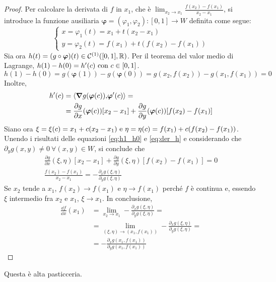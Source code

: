 \begin{proof}
    Per calcolare la derivata di $f$ in $x_1$, che è $\displaystyle\lim_{x_2\to x_1}\frac{f(x_2)-f(x_1)}{x_2-x_1}$, si introduce la funzione ausiliaria $\bm \varphi=(\varphi_1,\varphi_2):[0,1]\to W$ definita come segue:
    $$
        \begin{cases}
            x=\varphi_1(t)=x_1+t(x_2-x_1)\\
            y=\varphi_2(t)=f(x_1)+t(f(x_2)-f(x_1))
        \end{cases}
    $$
    Sia ora $h(t)=(g\circ\bm\varphi)(t) \in \mathcal{C}^{(1)}([0,1],\mathbb{R})$. Per il teorema del valor medio di Lagrange, $h(1)-h(0)=h'(c) \text{ con } c \in [0,1]$.
    \begin{equation}
        h(1)-h(0)=g(\bm\varphi(1))-g(\bm\varphi(0))=g(x_2,f(x_2))-g(x_1,f(x_1))=0\label{eq:h1_h0}
    \end{equation}
    Inoltre,
    \begin{align}
        h'(c)
        &=\left\langle\grad g(\bm\varphi(c)){,}\bm\varphi'(c)\right\rangle=\notag\\
        &=\frac{\partial g}{\partial x}(\bm\varphi(c))[x_2-x_1]+\frac{\partial g}{\partial y}(\bm\varphi(c))[f(x_2)-f(x_1)]\label{eq:der_h}
    \end{align}
    Siano ora $\xi=\xi(c)=x_1+c(x_2-x_1) \text{ e } \eta=\eta(c)=f(x_1)+c(f(x_2)-f(x_1))$. Unendo i risultati delle equazioni \eqref{eq:h1_h0} e \eqref{eq:der_h} e considerando che $\partial_yg(x,y)\neq 0 \ \forall (x,y) \in W$, si conclude che
    \begin{gather*}
        \frac{\partial g}{\partial x}(\xi,\eta)[x_2-x_1]+\frac{\partial g}{\partial y}(\xi,\eta)[f(x_2)-f(x_1)]=0\\
        \frac{f(x_2)-f(x_1)}{x_2-x_1}=-\frac{\partial_x g(\xi,\eta)}{\partial_y g(\xi,\eta)}
    \end{gather*}
    Se $x_2$ tende a $x_1$, $f(x_2)\to f(x_1)$ e $\eta \to f(x_1)$ perché $f$ è continua e, essendo $\xi$ intermedio fra $x_2$ e $x_1$, $\xi \to x_1$. In conclusione,
    \begin{align*}
        \frac{\dd f}{\dd x}(x_1)&=\lim_{x_2\to x_1}-\frac{\partial_x g(\xi,\eta)}{\partial_y g(\xi,\eta)}=\\
        &=\lim_{(\xi,\eta)\to(x_1,f(x_1))}-\frac{\partial_x g(\xi,\eta)}{\partial_y g(\xi,\eta)}=\\
        &=-\frac{\partial_x g(x_1,f(x_1))}{\partial_y g(x_1,f(x_1))}
    \end{align*}
\end{proof}

\begin{remark}
    Questa è alta pasticceria.
\end{remark}

